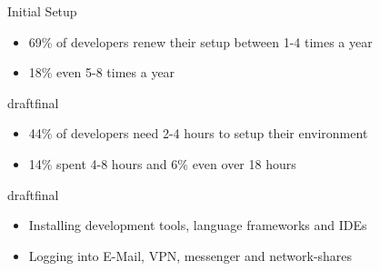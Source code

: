 \documentclass{beamer}
\def\final{final}
\def\status{draft}
\begin{document}
\begin{frame}{}
  \vspace{-0.2cm}
  \begin{center}
    \Large Initial Setup
  \end{center}

  \begin{block}{}
    \begin{itemize}
      \small
      \setlength\itemsep{0em}
      \item 69\% of developers renew their setup between 1-4 times a year
      \item 18\% even 5-8 times a year
    \end{itemize}
  \end{block}

  \ifx\status\final{}
    \pause{}
  \fi


  \begin{block}{}
    \begin{itemize}
      \small
      \setlength\itemsep{0em}
      \item 44\% of developers need 2-4 hours to setup their environment
      \item 14\% spent 4-8 hours and 6\% even over 18 hours
    \end{itemize}
  \end{block}

  \ifx\status\final{}
    \pause{}
  \fi


  \begin{block}{}
    \begin{itemize}
      \small
      \setlength\itemsep{0em}
      \item Installing development tools, language frameworks and IDEs
      \item Logging into E-Mail, VPN, messenger and network-shares
    \end{itemize}
  \end{block}
\end{frame}
\end{document}
